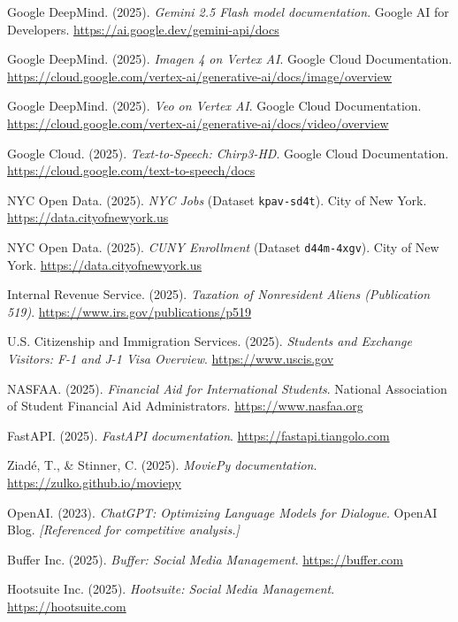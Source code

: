 \documentclass[12pt, letterpaper]{article}
\begin{document}
\begin{enumerate}[leftmargin=2em, label={[\arabic*]}]

  \item Google DeepMind. (2025). \textit{Gemini 2.5 Flash model documentation}.
    Google AI for Developers.
    \url{https://ai.google.dev/gemini-api/docs}

  \item Google DeepMind. (2025). \textit{Imagen 4 on Vertex AI}.
    Google Cloud Documentation.
    \url{https://cloud.google.com/vertex-ai/generative-ai/docs/image/overview}

  \item Google DeepMind. (2025). \textit{Veo on Vertex AI}.
    Google Cloud Documentation.
    \url{https://cloud.google.com/vertex-ai/generative-ai/docs/video/overview}

  \item Google Cloud. (2025). \textit{Text-to-Speech: Chirp3-HD}.
    Google Cloud Documentation.
    \url{https://cloud.google.com/text-to-speech/docs}

  \item NYC Open Data. (2025). \textit{NYC Jobs} (Dataset \texttt{kpav-sd4t}).
    City of New York.
    \url{https://data.cityofnewyork.us}

  \item NYC Open Data. (2025). \textit{CUNY Enrollment} (Dataset \texttt{d44m-4xgv}).
    City of New York.
    \url{https://data.cityofnewyork.us}

  \item Internal Revenue Service. (2025). \textit{Taxation of Nonresident Aliens (Publication 519)}.
    \url{https://www.irs.gov/publications/p519}

  \item U.S. Citizenship and Immigration Services. (2025). \textit{Students and Exchange
    Visitors: F-1 and J-1 Visa Overview}.
    \url{https://www.uscis.gov}

  \item NASFAA. (2025). \textit{Financial Aid for International Students}.
    National Association of Student Financial Aid Administrators.
    \url{https://www.nasfaa.org}

  \item FastAPI. (2025). \textit{FastAPI documentation}.
    \url{https://fastapi.tiangolo.com}

  \item Ziadé, T., \& Stinner, C. (2025). \textit{MoviePy documentation}.
    \url{https://zulko.github.io/moviepy}

  \item OpenAI. (2023). \textit{ChatGPT: Optimizing Language Models for Dialogue}.
    OpenAI Blog. \emph{[Referenced for competitive analysis.]}

  \item Buffer Inc. (2025). \textit{Buffer: Social Media Management}.
    \url{https://buffer.com}

  \item Hootsuite Inc. (2025). \textit{Hootsuite: Social Media Management}.
    \url{https://hootsuite.com}

\end{enumerate}
\end{document}
